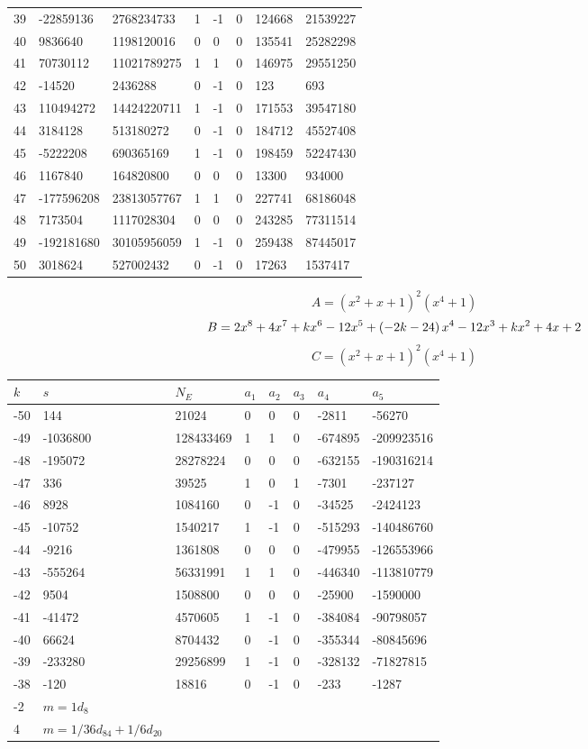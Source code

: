 \documentclass{amsart}
\begin{document}
\begin{longtable}{|l|l|l|lllll|}
39&-22859136&2768234733&1&-1&0&124668&21539227\\
40&9836640&1198120016&0&0&0&135541&25282298\\
41&70730112&11021789275&1&1&0&146975&29551250\\
42&-14520&2436288&0&-1&0&123&693\\
43&110494272&14424220711&1&-1&0&171553&39547180\\
44&3184128&513180272&0&-1&0&184712&45527408\\
45&-5222208&690365169&1&-1&0&198459&52247430\\
46&1167840&164820800&0&0&0&13300&934000\\
47&-177596208&23813057767&1&1&0&227741&68186048\\
48&7173504&1117028304&0&0&0&243285&77311514\\
49&-192181680&30105956059&1&-1&0&259438&87445017\\
50&3018624&527002432&0&-1&0&17263&1537417\\
\hline
\end{longtable}
$$A=(x^2
 + x
 + 1)^{2}(x^4
 + 1)$$
$$B=2\*x^8
 + 4\*x^7
 + k\*x^6
 - 12\*x^5
 + \left(-2\*k
 - 24\right) \*x^4
 - 12\*x^3
 + k\*x^2
 + 4\*x
 + 2$$
$$C=(x^2
 + x
 + 1)^{2}(x^4
 + 1)$$
\begin{longtable}{|l|l|l|lllll|}
\hline
$k$ & $s$ & $N_E$ & $a_1$ & $a_2$ & $a_3$ & $a_4$ & $a_5$\\
\hline
-50&144&21024&0&0&0&-2811&-56270\\
-49&-1036800&128433469&1&1&0&-674895&-209923516\\
-48&-195072&28278224&0&0&0&-632155&-190316214\\
-47&336&39525&1&0&1&-7301&-237127\\
-46&8928&1084160&0&-1&0&-34525&-2424123\\
-45&-10752&1540217&1&-1&0&-515293&-140486760\\
-44&-9216&1361808&0&0&0&-479955&-126553966\\
-43&-555264&56331991&1&1&0&-446340&-113810779\\
-42&9504&1508800&0&0&0&-25900&-1590000\\
-41&-41472&4570605&1&-1&0&-384084&-90798057\\
-40&66624&8704432&0&-1&0&-355344&-80845696\\
-39&-233280&29256899&1&-1&0&-328132&-71827815\\
-38&-120&18816&0&-1&0&-233&-1287\\
-2&$m=1d_{8}$&&\multicolumn{5}{c|}{}\\
4&$m=1/36d_{84}+1/6d_{20}$&&\multicolumn{5}{c|}{}\\
\hline
\end{longtable}
\end{document}
